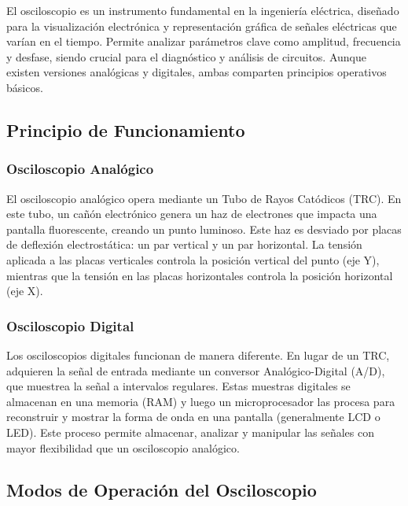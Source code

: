 
El osciloscopio es un instrumento fundamental en la ingeniería eléctrica, diseñado para la visualización electrónica y representación gráfica de señales eléctricas que varían en el tiempo. Permite analizar parámetros clave como amplitud, frecuencia y desfase, siendo crucial para el diagnóstico y análisis de circuitos. Aunque existen versiones analógicas y digitales, ambas comparten principios operativos básicos.

\subsection{Principio de Funcionamiento}

\subsubsection{Osciloscopio Analógico}
El osciloscopio analógico opera mediante un Tubo de Rayos Catódicos (TRC). En este tubo, un cañón electrónico genera un haz de electrones que impacta una pantalla fluorescente, creando un punto luminoso. Este haz es desviado por placas de deflexión electrostática: un par vertical y un par horizontal. La tensión aplicada a las placas verticales controla la posición vertical del punto (eje Y), mientras que la tensión en las placas horizontales controla la posición horizontal (eje X).

\subsubsection{Osciloscopio Digital}
Los osciloscopios digitales funcionan de manera diferente. En lugar de un TRC, adquieren la señal de entrada mediante un conversor Analógico-Digital (A/D), que muestrea la señal a intervalos regulares. Estas muestras digitales se almacenan en una memoria (RAM) y luego un microprocesador las procesa para reconstruir y mostrar la forma de onda en una pantalla (generalmente LCD o LED). Este proceso permite almacenar, analizar y manipular las señales con mayor flexibilidad que un osciloscopio analógico.

\subsection{Modos de Operación del Osciloscopio}

